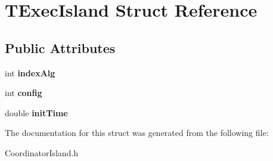 \hypertarget{structTExecIsland}{}\section{T\+Exec\+Island Struct Reference}
\label{structTExecIsland}
\subsection*{Public Attributes}
\begin{DoxyCompactItemize}
\item 
\mbox{\label{structTExecIsland_adef5b7f291eb009d1f2ec6c496bff951}} 
int {\bfseries index\+Alg}
\item 
\mbox{\label{structTExecIsland_a521d31772dd2ca8ab75a5af821fad5eb}} 
int {\bfseries config}
\item 
\mbox{\label{structTExecIsland_a72ef7e13e5bb74b217f7415f2766ecf1}} 
double {\bfseries init\+Time}
\end{DoxyCompactItemize}


The documentation for this struct was generated from the following file\+:\begin{DoxyCompactItemize}
\item 
Coordinator\+Island.\+h\end{DoxyCompactItemize}
